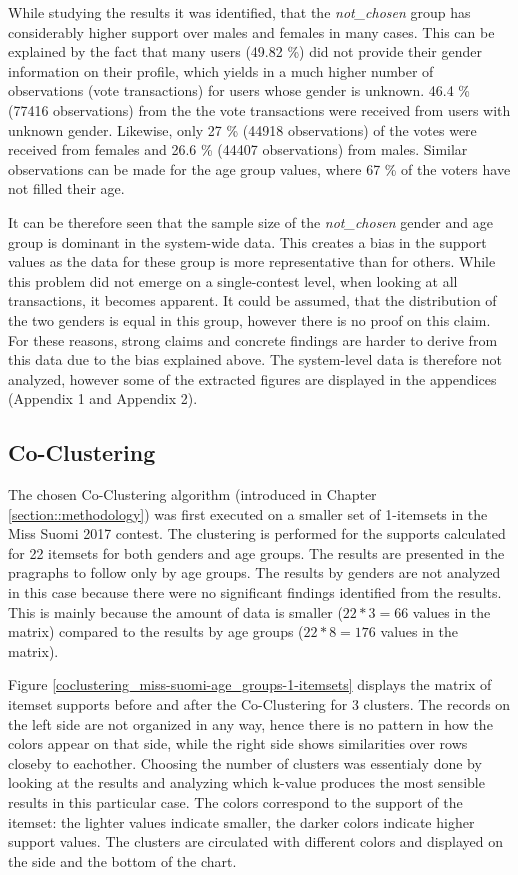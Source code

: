 While studying the results it was identified, that the \emph{not\_chosen} group has considerably higher support over males and females in many cases. This can be explained by the fact that many users (49.82 \%) did not provide their gender information on their profile, which yields in a much higher number of observations (vote transactions) for users whose gender is unknown. 46.4 \% (77416 observations) from the the vote transactions were received from users with unknown gender. Likewise, only 27 \% (44918 observations) of the votes were received from females and 26.6 \% (44407 observations) from males. Similar observations can be made for the age group values, where 67 \% of the voters have not filled their age. 

It can be therefore seen that the sample size of the \emph{not\_chosen} gender and age group is dominant in the system-wide data. This creates a bias in the support values as the data for these group is more representative than for others. While this problem did not emerge on a single-contest level, when looking at all transactions, it becomes apparent. It could be assumed, that the distribution of the two genders is equal in this group, however there is no proof on this claim. For these reasons, strong claims and concrete findings are harder to derive from this data due to the bias explained above. The system-level data is therefore not analyzed, however some of the extracted figures are displayed in the appendices (Appendix 1 and Appendix 2). 

\subsection{Co-Clustering}
The chosen Co-Clustering algorithm (introduced in Chapter \ref{section::methodology}) was first executed on a smaller set of 1-itemsets in the Miss Suomi 2017 contest. The clustering is performed for the supports calculated for 22 itemsets for both genders and age groups. The results are presented in the pragraphs to follow only by age groups. The results by genders are not analyzed in this case because there were no significant findings identified from the results. This is mainly because the amount of data is smaller ($22*3=66$ values in the matrix) compared to the results by age groups ($22*8=176$ values in the matrix). 

Figure \ref{coclustering_miss-suomi-age_groups-1-itemsets} displays the matrix of itemset supports before and after the Co-Clustering for 3 clusters. The records on the left side are not organized in any way, hence there is no pattern in how the colors appear on that side, while the right side shows similarities over rows closeby to eachother. Choosing the number of clusters was essentialy done by looking at the results and analyzing which k-value produces the most sensible results in this particular case. The colors correspond to the support of the itemset: the lighter values indicate smaller, the darker colors indicate higher support values. The clusters are circulated with different colors and displayed on the side and the bottom of the chart. 

